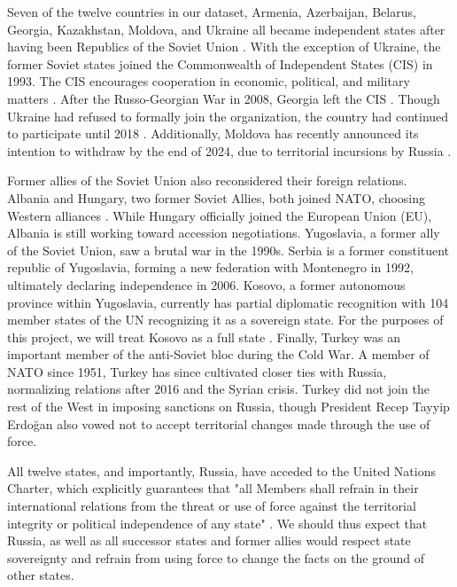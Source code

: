 \documentclass[12pt]{article}
\begin{document}
Seven of the twelve countries in our dataset, Armenia, Azerbaijan, Belarus, Georgia, Kazakhstan, Moldova, and Ukraine all became independent states after having been Republics of the Soviet Union \citep{masters_belarus-russia_2023}. With the exception of Ukraine, the former Soviet states joined the Commonwealth of Independent States (CIS) in 1993. The CIS encourages cooperation in economic, political, and military matters \citep{nations_charter_1945}. After the Russo-Georgian War in 2008, Georgia left the CIS \citep{team_georgia_2006}. Though Ukraine had refused to formally join the organization, the country had continued to participate until 2018 \citep{rferl_ukraine_2018}. Additionally, Moldova has recently announced its intention to withdraw by the end of 2024, due to territorial incursions by Russia \citep{chiu_moldova_2023}. 

Former allies of the Soviet Union also reconsidered their foreign relations. Albania and Hungary, two former Soviet Allies, both joined NATO, choosing Western alliances \citep{nato_nato_2024}. While Hungary officially joined the European Union (EU), Albania is still working toward accession negotiations. Yugoslavia, a former ally of the Soviet Union, saw a brutal war in the 1990s. Serbia is a former constituent republic of Yugoslavia, forming a new federation with Montenegro in 1992, ultimately declaring independence in 2006. Kosovo, a former autonomous province within Yugoslavia, currently has partial diplomatic recognition with 104 member states of the UN recognizing it as a sovereign state. For the purposes of this project, we will treat Kosovo as a full state \citep{mcbride_russias_2023}. Finally, Turkey was an important member of the anti-Soviet bloc during the Cold War. A member of NATO since 1951, Turkey has since cultivated closer ties with Russia, normalizing relations after 2016 and the Syrian crisis. Turkey did not join the rest of the West in imposing sanctions on Russia, though President Recep Tayyip Erdoğan also vowed not to accept territorial changes made through the use of force. 

All twelve states, and importantly, Russia, have acceded to the United Nations Charter, which explicitly guarantees that "all Members shall refrain in their international relations from the threat or use of force against the territorial integrity or political independence of any state" \citep{nations_charter_1945}. We should thus expect that Russia, as well as all successor states and former allies would respect state sovereignty and refrain from using force to change the facts on the ground of other states. 
\end{document}
